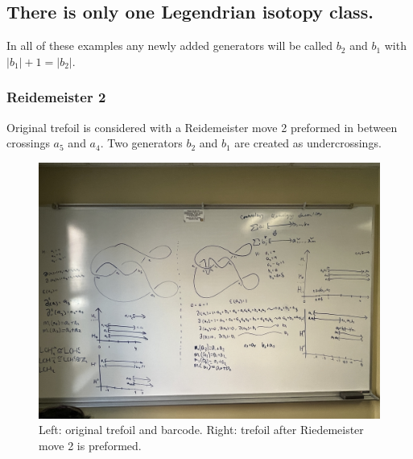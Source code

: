 \documentclass[General-Information/Most_recent_log(3_0).tex]{subfiles}
\begin{document}
\subsection{There is only one Legendrian isotopy class.}
In all of these examples any newly added generators will be called $b_2$ and $b_1$ with $|b_1|+1=|b_2|$.
\subsubsection{Reidemeister 2}
\begin{example}
    \label{ex:1}
    Original trefoil is considered with a Reidemeister move 2 preformed in between crossings $a_5$ and $a_4$. Two generators $b_2$ and $b_1$ are created as undercrossings. 
    \begin{figure}[H]
        \centering
        \includegraphics[width=\textwidth]{General-Information/Pictures/Examples/IMG-2747.JPG}
        \caption{Left: original trefoil and barcode. Right: trefoil after Riedemeister move 2 is preformed.}
    \end{figure}
\end{example}
\end{document}
